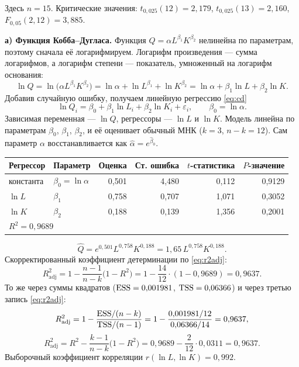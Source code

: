 \begin{solution}
Здесь $n = 15$. Критические значения: $t_{0{,}025}(12) = 2{,}179$,
$t_{0{,}025}(13) = 2{,}160$, $F_{0{,}05}(2, 12) = 3{,}885$.

\medskip
\textbf{а) Функция Кобба--Дугласа.} Функция $Q = \alpha L^{\beta_1}K^{\beta_2}$
нелинейна по параметрам, поэтому сначала её логарифмируем. Логарифм
произведения — сумма логарифмов, а логарифм степени — показатель, умноженный на
логарифм основания:
\[
  \ln Q = \ln\bigl(\alpha L^{\beta_1}K^{\beta_2}\bigr)
        = \ln\alpha + \ln L^{\beta_1} + \ln K^{\beta_2}
        = \ln\alpha + \beta_1\ln L + \beta_2\ln K .
\]
Добавив случайную ошибку, получаем линейную регрессию \eqref{eq:cd}
\[
  \ln Q_i = \beta_0 + \beta_1\ln L_i + \beta_2\ln K_i + \varepsilon_i,
  \qquad \beta_0 = \ln\alpha .
\]
Зависимая переменная — $\ln Q$, регрессоры — $\ln L$ и $\ln K$. Модель линейна
по параметрам $\beta_0$, $\beta_1$, $\beta_2$, и её оценивает обычный МНК
($k = 3$, $n - k = 12$). Сам параметр $\alpha$ восстанавливается как
$\widehat{\alpha} = e^{\widehat{\beta}_0}$.
\begin{center}
\begin{tabular}{llrrrr}
\toprule
Регрессор & Параметр & Оценка & Ст. ошибка & $t$-статистика & $P$-значение \\
\midrule
константа & $\beta_0 = \ln\alpha$ & 0,501 & 4,480 & 0,112 & 0,9129 \\
$\ln L$   & $\beta_1$            & 0,758 & 0,707 & 1,071 & 0,3052 \\
$\ln K$   & $\beta_2$            & 0,188 & 0,139 & 1,356 & 0,2001 \\
\midrule
\multicolumn{6}{l}{$R^2 = 0{,}9689$} \\
\bottomrule
\end{tabular}
\end{center}
\[
  \widehat{Q} = e^{0{,}501}L^{0{,}758}K^{0{,}188} = 1{,}65\,L^{0{,}758}K^{0{,}188}.
\]
Скорректированный коэффициент детерминации по \eqref{eq:r2adj}:
\[
  R^2_{\text{adj}} = 1 - \frac{n-1}{n-k}\bigl(1 - R^2\bigr)
                   = 1 - \frac{14}{12}\cdot(1 - 0{,}9689) = 0{,}9637 .
\]
То же через суммы квадратов ($\mathrm{ESS} = 0{,}001981$, $\mathrm{TSS} = 0{,}06366$) и через
третью запись \eqref{eq:r2adj}:
\[
  R^2_{\text{adj}} = 1 - \frac{\mathrm{ESS}/(n-k)}{\mathrm{TSS}/(n-1)}
                   = 1 - \frac{0{,}001981/12}{0{,}06366/14} = 0{,}9637,
\]
\[
  R^2_{\text{adj}} = R^2 - \frac{k-1}{n-k}\bigl(1 - R^2\bigr)
                   = 0{,}9689 - \frac{2}{12}\cdot 0{,}0311 = 0{,}9637 .
\]
Выборочный коэффициент корреляции $r(\ln L, \ln K) = 0{,}992$.


\end{solution}
